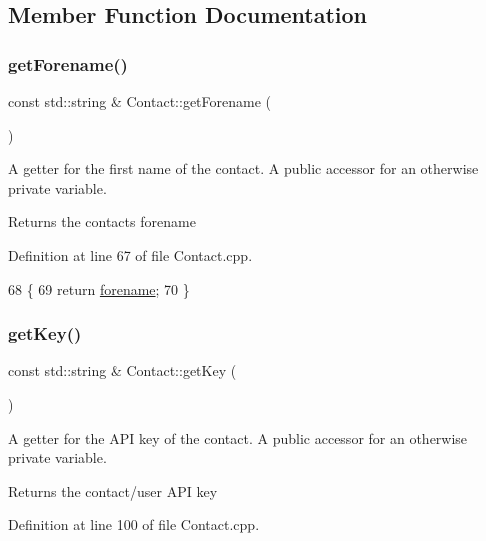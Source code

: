 \subsection{Member Function Documentation}
\mbox{\label{class_contact_a2a2311964fe1a1e48ff41f4ddf355c60}} 
\subsubsection{\texorpdfstring{get\+Forename()}{getForename()}}
{\footnotesize\ttfamily const std\+::string \& Contact\+::get\+Forename (\begin{DoxyParamCaption}{ }\end{DoxyParamCaption})}

A getter for the first name of the contact. A public accessor for an otherwise private variable.

\begin{DoxyReturn}{Returns}
the contact\textquotesingle{}s forename 
\end{DoxyReturn}


Definition at line 67 of file Contact.\+cpp.


\begin{DoxyCode}
68 \{
69     \textcolor{keywordflow}{return} \hyperlink{class_contact_af64e25f3271abad7970293e6adfdf457}{forename};
70 \}
\end{DoxyCode}
\mbox{\label{class_contact_a9be97218caf5efd7dabe2b237d85a22f}} 
\subsubsection{\texorpdfstring{get\+Key()}{getKey()}}
{\footnotesize\ttfamily const std\+::string \& Contact\+::get\+Key (\begin{DoxyParamCaption}{ }\end{DoxyParamCaption})}

A getter for the A\+PI key of the contact. A public accessor for an otherwise private variable.

\begin{DoxyReturn}{Returns}
the contact/user A\+PI key 
\end{DoxyReturn}


Definition at line 100 of file Contact.\+cpp.


